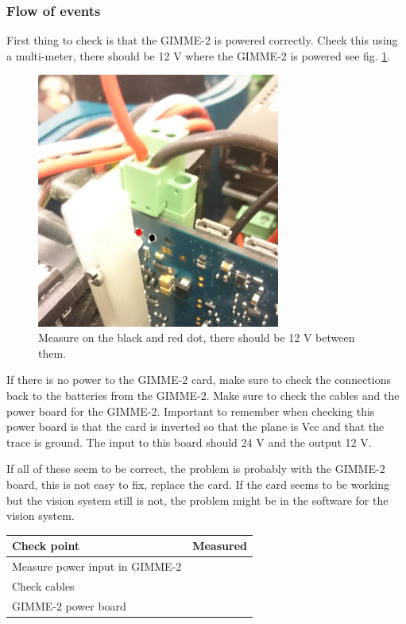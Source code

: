 \subsubsection*{Flow of events}
First thing to check is that the GIMME-2 is powered correctly. Check this using a multi-meter, there should be 12 V where the GIMME-2 is powered see fig. \ref{GimmePower}. 
\begin{figure}[!ht]
	\begin{center}
		\includegraphics[width=80mm]{./Images/Tests/Gimme-power.jpg}
		\caption{Measure on the black and red dot, there should be 12 V between them.}
		\label{GimmePower}
	\end{center}
\end{figure}
If there is no power to the GIMME-2 card, make sure to check the connections back to the batteries from the GIMME-2. Make sure to check the cables and the power board for the GIMME-2. Important to remember when checking this power board is that the card is inverted so that the plane is Vcc and that the trace is ground. The input to this board should 24 V and the output 12 V. 

If all of these seem to be correct, the problem is probably with the GIMME-2 board, this is not easy to fix, replace the card. If the card seems to be working but the vision system still is not, the problem might be in the software for the vision system. 

\begin{tabular}{| l | c |}
\hline
Check point & Measured \\ \hline
Measure power input in GIMME-2 & \\ \hline
Check cables & \\ \hline
GIMME-2 power board & \\ \hline
\end{tabular} 

